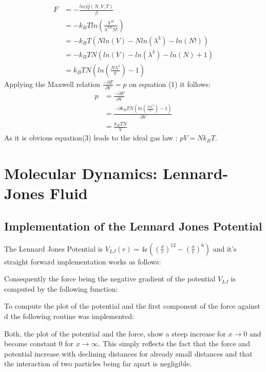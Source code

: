 \documentclass[12pt,a4paper]{scrartcl}
\begin{document}
 \begin{align}
 F&= -\frac{ln(Q(N,V,T)}{\beta}\nonumber\\
 &= -k_BT  ln\left(\frac{V^N}{\lambda^{3N}N!}\right)\nonumber\\
 &= -k_BT\left(N ln(V) - N ln(\lambda^{3}) - ln(N!)\right)\nonumber\\
 &= -k_BTN\left(ln(V) - ln(\lambda^{3}) -ln(N) + 1\right)\nonumber\\
 &= k_BTN\left(ln\left(\frac{N\lambda^3}{V}\right)-1\right)
 \end{align}
 Applying the Maxwell relation $\frac{-\partial F}{\partial V}=p$ on equation (1) it follows:\\
  \begin{align}
 p&=\frac{-\partial F}{\partial V} \nonumber\\
 &=\frac{-\partial k_BTN\left(ln\left(\frac{N\lambda^3}{V}\right)-1\right) }{\partial V}\nonumber\\
 &=\frac{k_BTN}{V}
 \end{align}
As it is obvious equation(3) leads to the ideal gas law : $pV=Nk_BT$.

\section{Molecular Dynamics: Lennard-Jones Fluid}
\subsection{Implementation of the Lennard Jones Potential}
The Lennard Jones Potential is $V_{LJ}(r)=4\epsilon\left(\left(\frac{\sigma}{r}\right)^{12}-\left(\frac{\sigma}{r}\right)^{6}\right) $ and it's straight forward implementation works as follows:

Consequently the force being the negative gradient of the potential $V_{LJ}$ is  computed by the following function:

To compute the plot of the potential and the first component of the force against d the following routine was implemented:

Both, the plot of the potential and the force, show a steep increase for $x \rightarrow 0$ and become constant 0 for $x\rightarrow \infty$. This simply reflects the fact that the force and potential increase with declining distances for already small distances and that the interaction of two particles being far apart is negligible.
\end{document}
